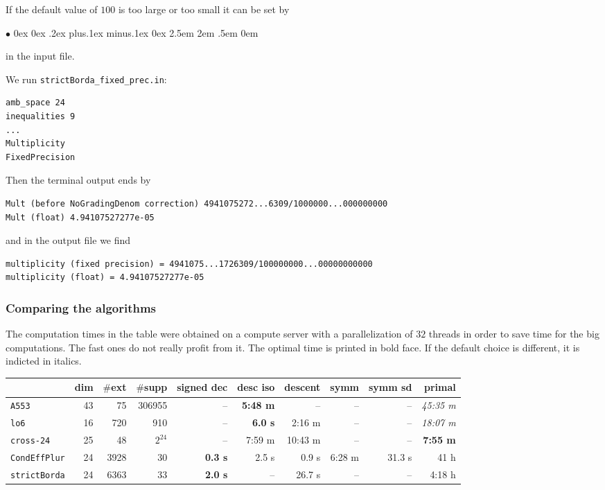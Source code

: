 \documentclass[12pt,a4paper]{scrartcl}
\newcommand{\stdli}{ \topsep0ex \partopsep0ex %
\parsep.2ex plus.1ex minus.1ex \itemsep0ex%
\leftmargin2.5em \labelwidth2em \labelsep.5em \rightmargin0em}%
\renewenvironment{itemize}{\begin{list}{{$\bullet$}}{\stdli}}{\end{list}}
\theoremstyle{definition}
\def\itemtt[#1]{\item[\textbf{\ttt{#1}}]}
\def\ttt{\texttt}
\begin{document}
 If the default value of $100$ is too large or too small it can be set by
 \begin{itemize}
 	\itemtt[decimal\_digits <N>]
 \end{itemize}
in the input file.

We run \verb|strictBorda_fixed_prec.in|:
\begin{Verbatim}
amb_space 24
inequalities 9
...
Multiplicity
FixedPrecision
\end{Verbatim}
Then the terminal output ends by
\begin{Verbatim}
Mult (before NoGradingDenom correction) 4941075272...6309/1000000...000000000
Mult (float) 4.94107527277e-05
\end{Verbatim}
and in the output file we find
\begin{Verbatim}
multiplicity (fixed precision) = 4941075...1726309/100000000...00000000000
multiplicity (float) = 4.94107527277e-05
\end{Verbatim}

\subsubsection{Comparing the algorithms}\label{vvv_compare}

The computation times in the table were obtained on a compute server with a parallelization of $32$ threads in order to save time for the big computations. The fast ones do not really profit from it. The optimal time is printed in bold face. If the default choice is different, it is indicted in italics.

\begin{footnotesize}
\begin{tabular}{l|r|r|r|r|r|r|r|r|r|}
& dim & $\#$ext & $\#$supp & signed dec&desc iso&descent& symm & symm sd& primal\\
\hline
\ttt{A553} & 43 &75&306955&--&\textbf{5:48 m}&--&--&--&\emph{45:35 m}\\
\hline
\ttt{lo6}&16&720&910& --   & \textbf{6.0 s}& 2:16 m & -- & --& \emph{18:07 m}\\
\hline
\ttt{cross-24}&25&48&$2^{24}$ & -- & 7:59 m &10:43 m & -- & --& \textbf{7:55 m}\\
\hline
\ttt{CondEffPlur}&24&3928&30& \textbf{0.3 s }&2.5 s & 0.9 s & 6:28 m & 31.3 s & 41 h \\
\hline
\ttt{strictBorda}&24&6363& 33 & \textbf{2.0 s} & -- & 26.7 s& -- & -- & 4:18 h \\
\hline
\end{tabular}
\end{footnotesize}
\end{document}
